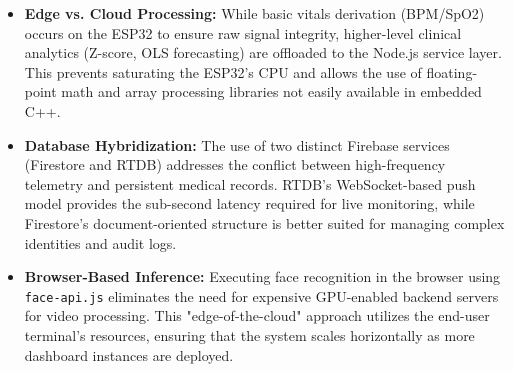 \begin{itemize}
    \item \textbf{Edge vs. Cloud Processing:} While basic vitals derivation (BPM/SpO2) occurs on the ESP32 to ensure raw signal integrity, higher-level clinical analytics (Z-score, OLS forecasting) are offloaded to the Node.js service layer. This prevents saturating the ESP32's CPU and allows the use of floating-point math and array processing libraries not easily available in embedded C++.
    \item \textbf{Database Hybridization:} The use of two distinct Firebase services (Firestore and RTDB) addresses the conflict between high-frequency telemetry and persistent medical records. RTDB's WebSocket-based push model provides the sub-second latency required for live monitoring, while Firestore's document-oriented structure is better suited for managing complex identities and audit logs.
	\item \textbf{Browser-Based Inference:} Executing face recognition in the browser using \texttt{face-api.js} eliminates the need for expensive GPU-enabled backend servers for video processing. This "edge-of-the-cloud" approach utilizes the end-user terminal's resources, ensuring that the system scales horizontally as more dashboard instances are deployed.
\end{itemize}
